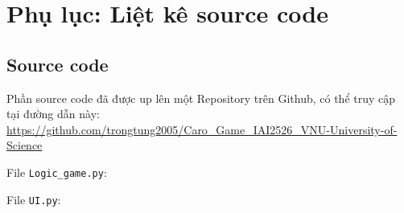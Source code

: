 \chapter*{Phụ lục: Liệt kê source code}
\label{Appendix} 

\section*{Source code}

Phần source code đã được up lên một Repository trên Github, có thể truy cập tại đường dẫn này: \url{https://github.com/trongtung2005/Caro_Game_IAI2526_VNU-University-of-Science}

\vspace{0.5cm}

File \texttt{Logic\_game.py}:



File \texttt{UI.py}:



